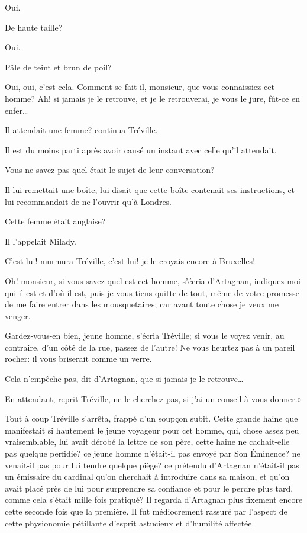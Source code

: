 \speak  Oui. 

\speak  De haute taille? 

\speak  Oui. 

\speak  Pâle de teint et brun de poil? 

\speak  Oui, oui, c'est cela. Comment se fait-il, monsieur, que vous connaissiez cet homme? Ah! si jamais je le retrouve, et je le retrouverai, je vous le jure, fût-ce en enfer\dots 

\speak  Il attendait une femme? continua Tréville. 

\speak  Il est du moins parti après avoir causé un instant avec celle qu'il attendait. 

\speak  Vous ne savez pas quel était le sujet de leur conversation? 

\speak  Il lui remettait une boîte, lui disait que cette boîte contenait ses instructions, et lui recommandait de ne l'ouvrir qu'à Londres. 

\speak  Cette femme était anglaise? 

\speak  Il l'appelait Milady. 

\speak  C'est lui! murmura Tréville, c'est lui! je le croyais encore à Bruxelles! 

\speak  Oh! monsieur, si vous savez quel est cet homme, s'écria d'Artagnan, indiquez-moi qui il est et d'où il est, puis je vous tiens quitte de tout, même de votre promesse de me faire entrer dans les mousquetaires; car avant toute chose je veux me venger. 

\speak  Gardez-vous-en bien, jeune homme, s'écria Tréville; si vous le voyez venir, au contraire, d'un côté de la rue, passez de l'autre! Ne vous heurtez pas à un pareil rocher: il vous briserait comme un verre. 

\speak  Cela n'empêche pas, dit d'Artagnan, que si jamais je le retrouve\dots 

\speak  En attendant, reprit Tréville, ne le cherchez pas, si j'ai un conseil à vous donner.» 

Tout à coup Tréville s'arrêta, frappé d'un soupçon subit. Cette grande haine que manifestait si hautement le jeune voyageur pour cet homme, qui, chose assez peu vraisemblable, lui avait dérobé la lettre de son père, cette haine ne cachait-elle pas quelque perfidie? ce jeune homme n'était-il pas envoyé par Son Éminence? ne venait-il pas pour lui tendre quelque piège? ce prétendu d'Artagnan n'était-il pas un émissaire du cardinal qu'on cherchait à introduire dans sa maison, et qu'on avait placé près de lui pour surprendre sa confiance et pour le perdre plus tard, comme cela s'était mille fois pratiqué? Il regarda d'Artagnan plus fixement encore cette seconde fois que la première. Il fut médiocrement rassuré par l'aspect de cette physionomie pétillante d'esprit astucieux et d'humilité affectée. 

